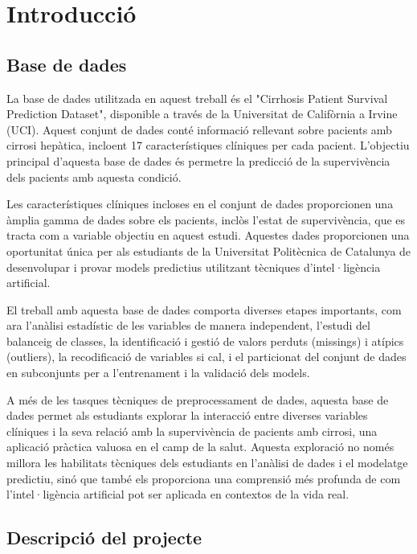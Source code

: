 \section{Introducció}

\subsection{Base de dades}
\cite{misc_cirrhosis_patient_survival_prediction_878}

La base de dades utilitzada en aquest treball és el "Cirrhosis Patient Survival Prediction Dataset", disponible a través de la Universitat de Califòrnia a Irvine (UCI). Aquest conjunt de dades conté informació rellevant sobre pacients amb cirrosi hepàtica, incloent 17 característiques clíniques per cada pacient. L'objectiu principal d'aquesta base de dades és permetre la predicció de la supervivència dels pacients amb aquesta condició.

Les característiques clíniques incloses en el conjunt de dades proporcionen una àmplia gamma de dades sobre els pacients, inclòs l'estat de supervivència, que es tracta com a variable objectiu en aquest estudi. Aquestes dades proporcionen una oportunitat única per als estudiants de la Universitat Politècnica de Catalunya de desenvolupar i provar models predictius utilitzant tècniques d'intel·ligència artificial.

El treball amb aquesta base de dades comporta diverses etapes importants, com ara l'anàlisi estadístic de les variables de manera independent, l'estudi del balanceig de classes, la identificació i gestió de valors perduts (missings) i atípics (outliers), la recodificació de variables si cal, i el particionat del conjunt de dades en subconjunts per a l'entrenament i la validació dels models.

A més de les tasques tècniques de preprocessament de dades, aquesta base de dades permet als estudiants explorar la interacció entre diverses variables clíniques i la seva relació amb la supervivència de pacients amb cirrosi, una aplicació pràctica valuosa en el camp de la salut. Aquesta exploració no només millora les habilitats tècniques dels estudiants en l'anàlisi de dades i el modelatge predictiu, sinó que també els proporciona una comprensió més profunda de com l'intel·ligència artificial pot ser aplicada en contextos de la vida real.

\subsection{Descripció del projecte}

